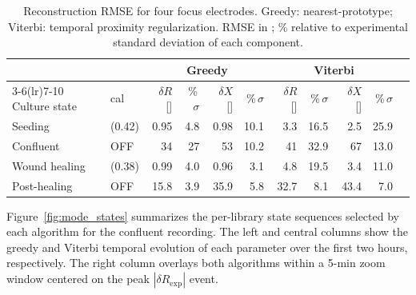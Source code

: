 \documentclass[english, 10pt, a4paper]{article}
\def\si#1{#1}%
\newcommand{\dR}{\ensuremath{\delta R}}
\newcommand{\dX}{\ensuremath{\delta X}}
\begin{document}
\begin{table}[H]
  \centering
  \caption{Reconstruction RMSE for four focus electrodes. Greedy: nearest-prototype; Viterbi: temporal proximity regularization. RMSE in \si{\ohm}; \% relative to experimental standard deviation of each component.}
  \label{tab:rmse}
  \small
  \begin{tabular}{llrrrrrrrrr}
  \toprule
   & & \multicolumn{4}{c}{Greedy} & \multicolumn{4}{c}{Viterbi} \\
  \cmidrule(lr){3-6}\cmidrule(lr){7-10}
  Culture state & cal & $\dR$ [\si{\ohm}] & \%\,$\sigma$ & $\dX$ [\si{\ohm}] & \%\,$\sigma$ & $\dR$ [\si{\ohm}] & \%\,$\sigma$ & $\dX$ [\si{\ohm}] & \%\,$\sigma$ \\
  \midrule
  Seeding        & (0.42) & 0.95 & 4.8  & 0.98 & 10.1 & 3.3  & 16.5 & 2.5  & 25.9 \\
  Confluent      & OFF    & 34   & 27   & 53   & 10.2 & 41   & 32.9 & 67   & 13.0 \\
  Wound healing  & (0.38) & 0.99 & 4.0  & 0.96 &  3.1 & 4.8  & 19.5 & 3.4  & 11.0 \\
  Post-healing   & OFF    & 15.8 & 3.9  & 35.9 &  5.8 & 32.7 &  8.1 & 43.4 &  7.0 \\
  \bottomrule
  \end{tabular}
\end{table}

Figure~\ref{fig:mode_states} summarizes the per-library state sequences selected by each algorithm for the confluent recording. The left and central columns show the greedy and Viterbi temporal evolution of each parameter over the first two hours, respectively. The right column overlays both algorithms within a 5-min zoom window centered on the peak $|\dR_{\mathrm{exp}}|$ event.
\end{document}
